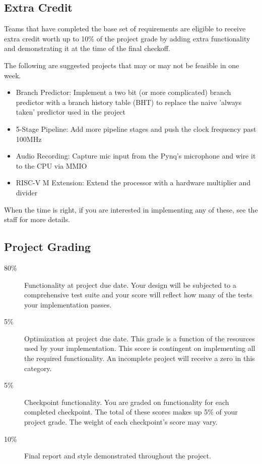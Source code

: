 \documentclass[11pt]{article}
\begin{document}
\subsection{Extra Credit}
\label{extra_credit}
Teams that have completed the base set of requirements are eligible to receive extra credit worth up to 10\% of the project grade by adding extra functionality and demonstrating it at the time of the final checkoff.

The following are suggested projects that may or may not be feasible in one week.
\begin{itemize}
  \item Branch Predictor: Implement a two bit (or more complicated) branch predictor with a branch history table (BHT) to replace the naive 'always taken' predictor used in the project
  \item 5-Stage Pipeline: Add more pipeline stages and push the clock frequency past 100MHz
  \item Audio Recording: Capture mic input from the Pynq's microphone and wire it to the CPU via MMIO
  \item RISC-V M Extension: Extend the processor with a hardware multiplier and divider
\end{itemize}

When the time is right, if you are interested in implementing any of these, see the staff for more details.

\subsection{Project Grading}
\label{deadlinegrading}

\begin{description}
  \item[80\%] {Functionality} at project due date. Your design will be subjected to a comprehensive test suite and your score will reflect how many of the tests your implementation passes.
  \item[5\%] {Optimization} at project due date. This grade is a function of the resources used by your implementation. This score is contingent on implementing all the required functionality.  An incomplete project will receive a zero in this category.
  \item[5\%] {Checkpoint} functionality. You are graded on functionality for each completed checkpoint. The total of these scores makes up 5\% of your project grade. The weight of each checkpoint's score may vary.
  \item[10\%] {Final report} and {style} demonstrated throughout the project.
\end{description}
\end{document}
